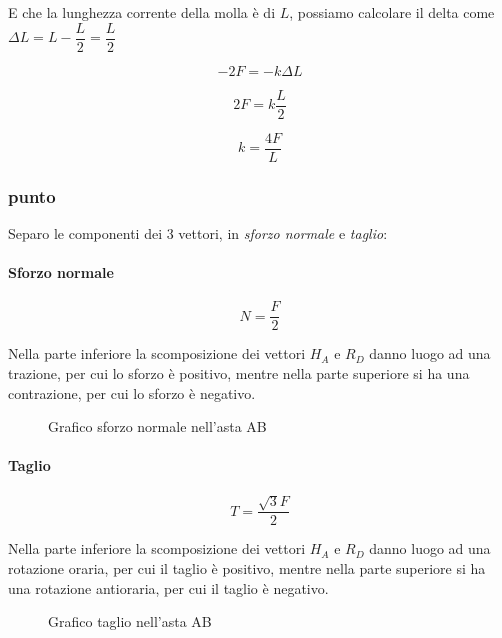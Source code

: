 \documentclass[main.tex]{subfiles}
\begin{document}
E che la lunghezza corrente della molla è di $L$, possiamo calcolare il delta come $\Delta L = L - \dfrac{L}{2} = \dfrac{L}{2}$

\begin{equation}
	-2F = -k\Delta L
\end{equation}

\begin{equation}
	2F = k\dfrac{L}{2}
\end{equation}

\begin{equation}
	k = \dfrac{4F}{L}
\end{equation}

\subsubsection{punto}
Separo le componenti dei 3 vettori, in \textit{sforzo normale} e \textit{taglio}:

\paragraph{Sforzo normale}

\[
	N = \dfrac{F}{2}
\]

Nella parte inferiore la scomposizione dei vettori $H_A$ e $R_D$ danno luogo ad una trazione, per cui lo sforzo è positivo, mentre nella parte superiore si ha una contrazione, per cui lo sforzo è negativo.

\begin{figure}[H]
\centering
\resizebox{.3\textwidth}{!}{}
\caption{Grafico sforzo normale nell'asta AB}
\end{figure}

\paragraph{Taglio}

\[
	T = \dfrac{\sqrt{3}F}{2}
\]

Nella parte inferiore la scomposizione dei vettori $H_A$ e $R_D$ danno luogo ad una rotazione oraria, per cui il taglio è positivo, mentre nella parte superiore si ha una rotazione antioraria, per cui il taglio è negativo.

\begin{figure}[H]
\centering
\resizebox{.3\textwidth}{!}{}
\caption{Grafico taglio nell'asta AB}
\end{figure}
\end{document}
